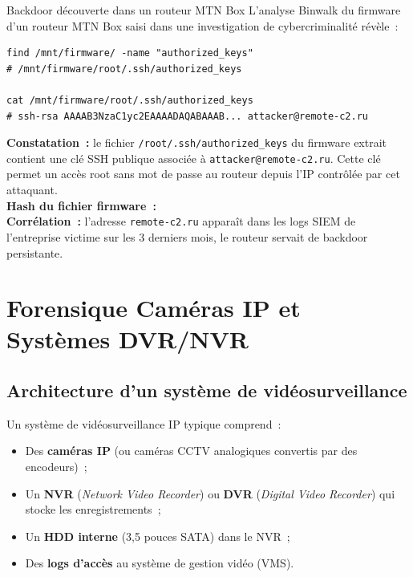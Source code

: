 \begin{boxscenario}{Backdoor découverte dans un routeur MTN Box}
L'analyse Binwalk du firmware d'un routeur MTN Box saisi dans une
investigation de cybercriminalité révèle~:

\begin{lstlisting}[language=bash_forensique]
find /mnt/firmware/ -name "authorized_keys"
# /mnt/firmware/root/.ssh/authorized_keys

cat /mnt/firmware/root/.ssh/authorized_keys
# ssh-rsa AAAAB3NzaC1yc2EAAAADAQABAAAB... attacker@remote-c2.ru
\end{lstlisting}

\textbf{Constatation~:} le fichier \texttt{/root/.ssh/authorized\_keys}
du firmware extrait contient une clé SSH publique associée à
\texttt{attacker@remote-c2.ru}. Cette clé permet un accès root sans
mot de passe au routeur depuis l'IP contrôlée par cet attaquant.\\[0.3ex]
\textbf{Hash du fichier firmware~:}
\\[0.3ex]
\textbf{Corrélation~:} l'adresse \texttt{remote-c2.ru} apparaît dans
les logs SIEM de l'entreprise victime sur les 3 derniers mois, le
routeur servait de backdoor persistante.
\end{boxscenario}

\section{Forensique Caméras IP et Systèmes DVR/NVR}
\label{sec:cameras-ip}

\subsection{Architecture d'un système de vidéosurveillance}

Un système de vidéosurveillance IP typique comprend~:
\begin{itemize}
    \item Des \textbf{caméras IP} (ou caméras CCTV analogiques
          convertis par des encodeurs)~;
    \item Un \textbf{NVR} (\textit{Network Video Recorder}) ou
          \textbf{DVR} (\textit{Digital Video Recorder}) qui stocke
          les enregistrements~;
    \item Un \textbf{HDD interne} (3,5 pouces SATA) dans le NVR~;
    \item Des \textbf{logs d'accès} au système de gestion vidéo (VMS).
\end{itemize}

